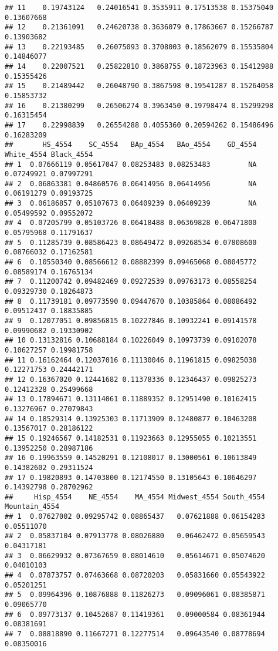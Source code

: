 \documentclass[
]{article}
\begin{document}
\begin{verbatim}
## 11    0.19743124   0.24016541 0.3535911 0.17513538 0.15375040 0.13607668
## 12    0.21361091   0.24620738 0.3636079 0.17863667 0.15266787 0.13903682
## 13    0.22193485   0.26075093 0.3708003 0.18562079 0.15535804 0.14846077
## 14    0.22007521   0.25822810 0.3868755 0.18723963 0.15412988 0.15355426
## 15    0.21489442   0.26048790 0.3867598 0.19541287 0.15264058 0.15853732
## 16    0.21380299   0.26506274 0.3963450 0.19798474 0.15299298 0.16315454
## 17    0.22998839   0.26554288 0.4055360 0.20594262 0.15486496 0.16283209
##       HS_4554    SC_4554   BAp_4554   BAo_4554    GD_4554 White_4554 Black_4554
## 1  0.07666119 0.05617047 0.08253483 0.08253483         NA 0.07249921 0.07997291
## 2  0.06863381 0.04860576 0.06414956 0.06414956         NA 0.06191279 0.09193725
## 3  0.06186857 0.05107673 0.06409239 0.06409239         NA 0.05499592 0.09552072
## 4  0.07205799 0.05103726 0.06418488 0.06369828 0.06471800 0.05795968 0.11791637
## 5  0.11285739 0.08586423 0.08649472 0.09268534 0.07808600 0.08766032 0.17162581
## 6  0.10550340 0.08566612 0.08882399 0.09465068 0.08045772 0.08589174 0.16765134
## 7  0.11200742 0.09482469 0.09272539 0.09763173 0.08558254 0.09329730 0.18264873
## 8  0.11739181 0.09773590 0.09447670 0.10385864 0.08086492 0.09512437 0.18835885
## 9  0.12077051 0.09856815 0.10227846 0.10932241 0.09141578 0.09990682 0.19330902
## 10 0.13132816 0.10688184 0.10226049 0.10973739 0.09102078 0.10627257 0.19981758
## 11 0.16162464 0.12037016 0.11130046 0.11961815 0.09825038 0.12271753 0.24442171
## 12 0.16367020 0.12441682 0.11378336 0.12346437 0.09825273 0.12412328 0.25499668
## 13 0.17894671 0.13114061 0.11889352 0.12951490 0.10162415 0.13276967 0.27079843
## 14 0.18529314 0.13925303 0.11713909 0.12480877 0.10463208 0.13567017 0.28186122
## 15 0.19246567 0.14182531 0.11923663 0.12955055 0.10213551 0.13952250 0.28987186
## 16 0.19963559 0.14520291 0.12108017 0.13000561 0.10613849 0.14382602 0.29311524
## 17 0.19820893 0.14703800 0.12174550 0.13105643 0.10646297 0.14392798 0.28702962
##     Hisp_4554    NE_4554    MA_4554 Midwest_4554 South_4554 Mountain_4554
## 1  0.07627002 0.09295742 0.08865437   0.07621888 0.06154283    0.05511070
## 2  0.05837104 0.07913778 0.08026880   0.06462472 0.05659543    0.04317181
## 3  0.06629932 0.07367659 0.08014610   0.05614671 0.05074620    0.04010103
## 4  0.07873757 0.07463668 0.08720203   0.05831660 0.05543922    0.05201251
## 5  0.09964396 0.10876888 0.11826273   0.09096061 0.08385871    0.09065770
## 6  0.09773137 0.10452687 0.11419361   0.09000584 0.08361944    0.08381691
## 7  0.08818890 0.11667271 0.12277514   0.09643540 0.08778694    0.08350016

\end{verbatim}
\end{document}
